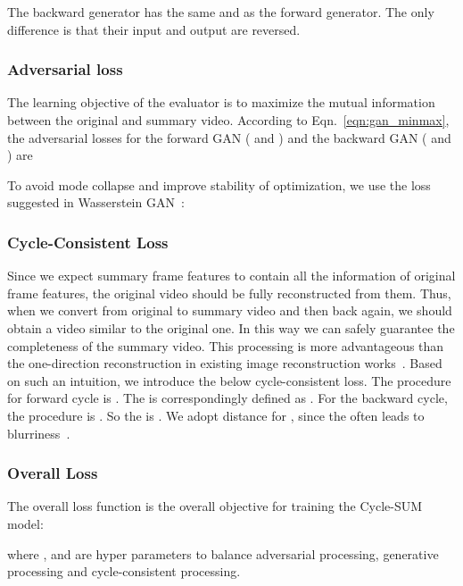\documentclass[letterpaper]{article} \usepackage{aaai19}  \usepackage{times}  \usepackage{helvet}  \usepackage{courier}  \usepackage{url}  \usepackage{graphicx}  \frenchspacing  \setlength{\pdfpagewidth}{8.5in}  \setlength{\pdfpageheight}{11in}  \usepackage{amsmath}
\begin{document}
The backward generator  has the same  and  as the forward generator. The only difference is that their input and output are reversed.

\subsubsection{\textbf{Adversarial loss} }
The learning objective of the evaluator is to maximize the mutual information between the original and summary video. According to Eqn.~\eqref{eqn:gan_minmax}, the adversarial losses for the forward GAN ( and ) and the backward GAN ( and ) are


To avoid mode collapse and improve stability of optimization, we use the loss suggested in Wasserstein GAN~\cite{arjovsky2017wasserstein}:



\subsubsection{\textbf{Cycle-Consistent Loss }}
Since we expect summary frame features to contain all the information of original frame features, the original video should be fully reconstructed from them. Thus, when we convert from original to summary video and then back again, we should obtain a video similar to the original one. In this way we can safely guarantee the completeness of the summary video. This processing is more advantageous than the one-direction reconstruction in existing image reconstruction works~\cite{zhu2017unpaired,yi2017dualgan}. Based on such an intuition, we introduce the below cycle-consistent loss. The procedure for forward cycle is . The  is correspondingly defined as
.
For the backward cycle, the procedure is
. So the  is
.
We adopt  distance for , since the  often leads to blurriness~\cite{larsen2015autoencoding,he2016dual}.

\subsubsection{\textbf{Overall Loss }}
The overall loss function is the overall objective for training the Cycle-SUM model:

where ,  and  are hyper parameters to balance adversarial processing, generative processing and cycle-consistent processing.
\end{document}
